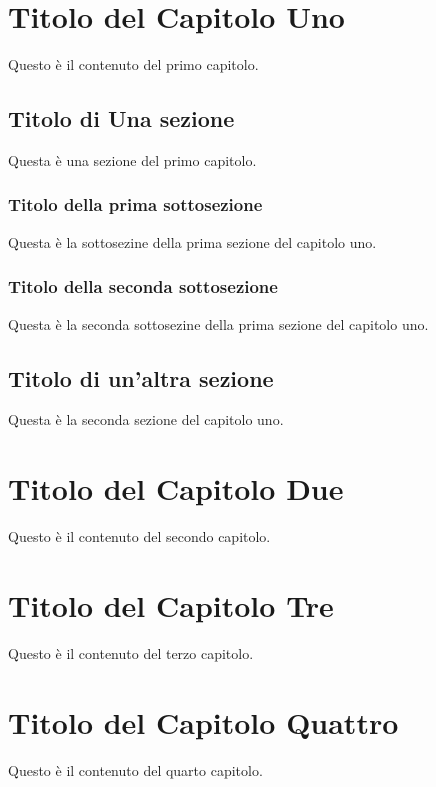 \chapter{Titolo del Capitolo Uno}
	Questo è il contenuto del primo capitolo.
	\section{Titolo di Una sezione}
		Questa è una sezione del primo capitolo.
		\subsection{Titolo della prima sottosezione}
			Questa è la sottosezine della prima sezione del capitolo uno.
		\subsection{Titolo della seconda sottosezione}
			Questa è la seconda sottosezine della prima sezione del capitolo uno.
	\section{Titolo di un'altra sezione}
		Questa è la seconda sezione del capitolo uno.

\chapter{Titolo del Capitolo Due}
	Questo è il contenuto del secondo capitolo.


\chapter{Titolo del Capitolo Tre}
	Questo è il contenuto del terzo capitolo.


\chapter{Titolo del Capitolo Quattro}
	Questo è il contenuto del quarto capitolo.
